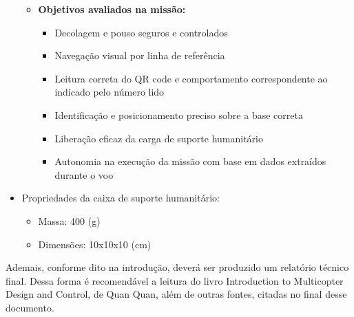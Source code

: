 \begin{itemize}
\begin{itemize}
        \item \textbf{Objetivos avaliados na missão:} 
        \begin{itemize}
            \item Decolagem e pouso seguros e controlados
            \item Navegação visual por linha de referência
            \item Leitura correta do QR code {\color{red}e comportamento correspondente ao indicado pelo número lido}
            \item {\color{red}Identificação e} posicionamento preciso sobre a base correta
            \item Liberação eficaz da carga de suporte humanitário
            \item Autonomia na execução da missão com base em dados extraídos durante o voo
        \end{itemize}
    \end{itemize}

    \item {\color{red} Propriedades da caixa de suporte humanitário:
    
    \begin{itemize}
        \item Massa: 400 (g)
        \item Dimensões: 10x10x10 (cm)
    \end{itemize}}
\end{itemize}

Ademais, conforme dito na introdução, deverá ser produzido um relatório técnico final. Dessa forma é recomendável a leitura do livro Introduction to Multicopter Design and Control, de Quan Quan, além de outras fontes, citadas no final desse documento.

